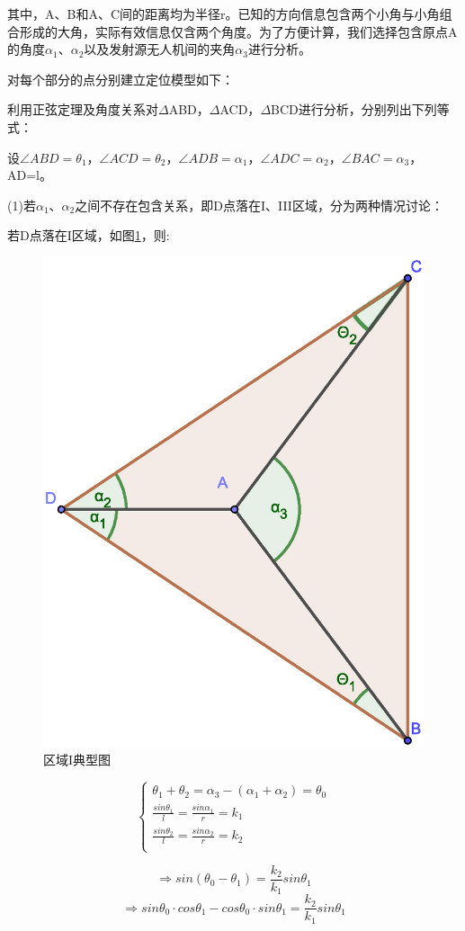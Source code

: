 \documentclass{ctexart}
\begin{document}
其中，A、B和A、C间的距离均为半径r。已知的方向信息包含两个小角与小角组合形成的大角，实际有效信息仅含两个角度。为了方便计算，我们选择包含原点A的角度$\alpha_1$、$\alpha_2$以及发射源无人机间的夹角$\alpha_3$进行分析。

对每个部分的点分别建立定位模型如下：

利用正弦定理及角度关系对$\Delta$ABD，$\Delta$ACD，$\Delta$BCD进行分析，分别列出下列等式：

设$\angle ABD=\theta_1$，$\angle ACD=\theta_2$，$\angle ADB=\alpha_1$，$\angle ADC=\alpha_2$，$\angle BAC=\alpha_3$，AD=l。

(1)若$\alpha_1$、$\alpha_2$之间不存在包含关系，即D点落在I、III区域，分为两种情况讨论：

若D点落在I区域，如图\ref{区域I典型图}，则:

\begin{figure}[H]
  \centering
  \includegraphics[width=0.35\linewidth]{pic/case1++.eps}
  \caption{区域I典型图}
  \label{区域I典型图}
  \end{figure} 

\begin{equation}
    \left\{
              \begin{array}{ll}
                \theta_1+\theta_2=\alpha_3-(\alpha_1+\alpha_2)=\theta_0\\
                \frac{sin\theta_1}{l}=\frac{sin\alpha_1}{r}=k_1\\
                \frac{sin\theta_2}{l}=\frac{sin\alpha_2}{r}=k_2\\

              \end{array}
            \right.
\end{equation}

\[
    \Rightarrow sin(\theta_0-\theta_1)=\frac{k_2}{k_1}sin\theta_1
\]
\[
    \Rightarrow sin\theta_0 \cdot cos\theta_1-cos\theta_0 \cdot sin\theta_1=\frac{k_2}{k_1}sin\theta_1
\]
\end{document}
